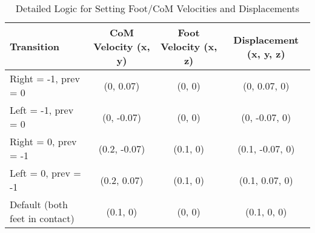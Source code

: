 \documentclass[main.tex]{subfiles}
\begin{document}
\begin{table}[H]
\centering
\renewcommand{\arraystretch}{1.2}
\caption{Detailed Logic for Setting Foot/CoM Velocities and Displacements}
\label{tab:logic_walking}
\begin{tabular}{|l|c|c|c|}
\hline
\textbf{Transition} & \textbf{CoM Velocity (x, y)} & \textbf{Foot Velocity (x, z)} & \textbf{Displacement (x, y, z)} \\
\hline
Right = -1, prev = 0 & (0, 0.07) & (0, 0) & (0, 0.07, 0) \\
Left = -1, prev = 0 & (0, -0.07) & (0, 0) & (0, -0.07, 0) \\
Right = 0, prev = -1 & (0.2, -0.07) & (0.1, 0) & (0.1, -0.07, 0) \\
Left = 0, prev = -1 & (0.2, 0.07) & (0.1, 0) & (0.1, 0.07, 0) \\
Default (both feet in contact) & (0.1, 0) & (0, 0) & (0.1, 0, 0) \\
\hline
\end{tabular}
\end{table}
\end{document}
